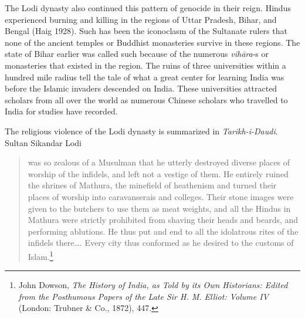 The Lodi dynasty also continued this pattern of genocide in their reign. Hindus experienced burning and killing in the regions of Uttar Pradesh, Bihar, and Bengal (Haig 1928). Such has been the iconoclasm of the Sultanate rulers that none of the ancient temples or Buddhist monasteries survive in these regions. The state of Bihar earlier was called such because of the numerous \textit{vihāra}-s or monasteries that existed in the region. The ruins of three universities within a hundred mile radius tell the tale of what a great center for learning India was before the Islamic invaders descended on India. These universities attracted scholars from all over the world as numerous Chinese scholars who travelled to India for studies have recorded. 

The religious violence of the Lodi dynasty is summarized in \textit{Tarikh-i-Daudi}. Sultan Sikandar Lodi
\begin{quote}
was so zealous of a Musulman that he utterly destroyed diverse places of worship of the infidels, and left not a vestige of them. He entirely ruined the shrines of Mathura, the minefield of heathenism and turned their places of worship into caravanserais and colleges. Their stone images were given to the butchers to use them as meat weights, and all the Hindus in Mathura were strictly prohibited from shaving their heads and beards, and performing ablutions. He thus put and end to all the idolatrous rites of the infidels there…. Every city thus conformed as he desired to the customs of Islam.\footnote{John Dowson, \textit{The History of India, as Told by its Own Historians: Edited from the Posthumous Papers of the Late Sir H. M. Elliot: Volume IV} (London: Trubner \& Co., 1872), 447.} 
\end{quote}
